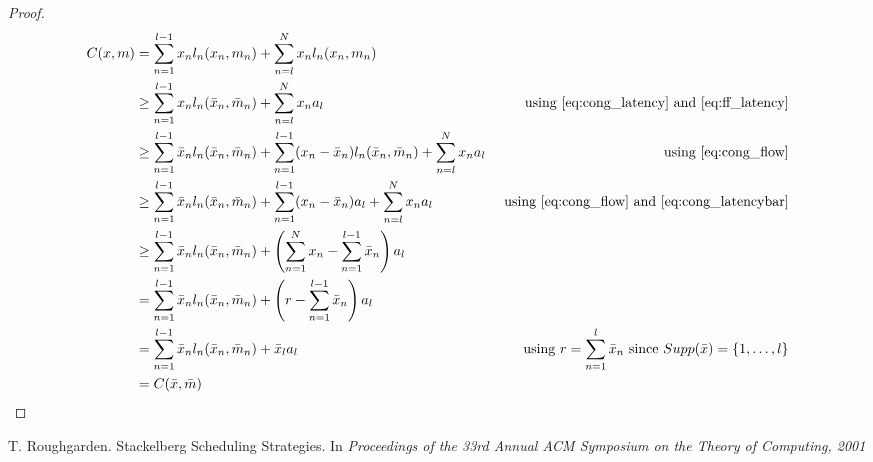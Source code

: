 \begin{proof}
\begin{align*}
C(x, m) 
&= \sum_{n = 1}^{l-1} x_n l_n(x_n, m_n) + \sum_{n = l}^{N} x_n l_n(x_n, m_n)\\
&\geq \sum_{n = 1}^{l-1} x_n l_n(\bar{x}_n, \bar{m}_n) + \sum_{n = l}^{N} x_n a_{l} 
&\text{ using \ref{eq:cong_latency} and \ref{eq:ff_latency}} \\
&\geq \sum_{n = 1}^{l-1} \bar{x}_n l_n(\bar{x}_n, \bar{m}_n) + \sum_{n = 1}^{l-1} (x_n - \bar{x}_n) l_n(\bar{x}_n, \bar{m}_n) + \sum_{n = l}^{N} x_n a_{l} 
&\text{ using \ref{eq:cong_flow}}\\
&\geq \sum_{n = 1}^{l-1} \bar{x}_n l_n(\bar{x}_n, \bar{m}_n) + \sum_{n = 1}^{l-1} (x_n - \bar{x}_n) a_{l} + \sum_{n = l}^{N} x_n a_{l}
&\text{ using \ref{eq:cong_flow} and \ref{eq:cong_latencybar}} \\
&\geq \sum_{n = 1}^{l-1} \bar{x}_n l_n(\bar{x}_n, \bar{m}_n) + 
\left( \sum_{n = 1}^{N} x_n - \sum_{n = 1}^{l-1}\bar{x}_n \right) a_{l}\\
&= \sum_{n = 1}^{l-1} \bar{x}_n l_n(\bar{x}_n, \bar{m}_n) + 
\left( r - \sum_{n = 1}^{l-1}\bar{x}_n \right) a_{l}\\
&= \sum_{n = 1}^{l-1} \bar{x}_n l_n(\bar{x}_n, \bar{m}_n) + \bar{x}_l a_{l} 
&\text{ using } r = \sum_{n = 1}^l \bar{x}_n \text{ since } Supp(\bar{x}) = \{ 1, \dots, l\}\\
&= C(\bar{x}, \bar{m})
\end{align*}

\end{proof}



\begin{thebibliography}{8}


 T. Roughgarden. Stackelberg Scheduling Strategies. In \emph{Proceedings of the 33rd Annual ACM Symposium on the Theory of Computing, 2001}

\end{thebibliography}

